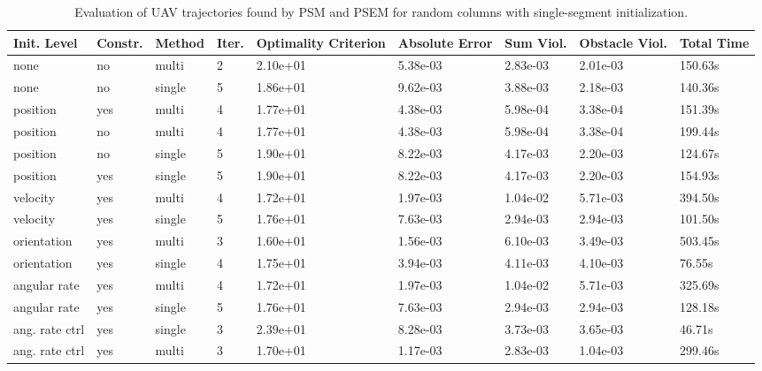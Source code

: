 \begin{table}
\small

\caption{Evaluation of UAV trajectories found by PSM and PSEM for random columns with single-segment initialization.}
\label{tab:traj-plan-eval-random_columns-single}
\begin{tabular}{p{21mm}p{9mm}p{12mm}p{6mm}p{14mm}p{14mm}p{14mm}p{14mm}p{14mm}}
\toprule
Init. Level & Constr. & Method & Iter. & Optimality Criterion & Absolute Error & Sum Viol. & Obstacle Viol. & Total Time \\
\midrule
none & no & multi & \cellcolor{color3} 2 & \cellcolor{color9} 2.10e+01 & 5.38e-03 & 2.83e-03 & 2.01e-03 & 150.63s \\
none & no & single & \cellcolor{color8} 5 & 1.86e+01 & \cellcolor{color8} 9.62e-03 & 3.88e-03 & 2.18e-03 & 140.36s \\
position & yes & multi & 4 & 1.77e+01 & 4.38e-03 & \cellcolor{color3} 5.98e-04 & \cellcolor{color3} 3.38e-04 & 151.39s \\
position & no & multi & 4 & 1.77e+01 & 4.38e-03 & \cellcolor{color3} 5.98e-04 & \cellcolor{color3} 3.38e-04 & 199.44s \\
position & no & single & \cellcolor{color8} 5 & 1.90e+01 & 8.22e-03 & 4.17e-03 & 2.20e-03 & 124.67s \\
position & yes & single & \cellcolor{color8} 5 & 1.90e+01 & 8.22e-03 & 4.17e-03 & 2.20e-03 & 154.93s \\
velocity & yes & multi & 4 & 1.72e+01 & 1.97e-03 & \cellcolor{color8} 1.04e-02 & \cellcolor{color8} 5.71e-03 & \cellcolor{color9} 394.50s \\
velocity & yes & single & \cellcolor{color8} 5 & 1.76e+01 & 7.63e-03 & 2.94e-03 & 2.94e-03 & 101.50s \\
orientation & yes & multi & \cellcolor{color10} 3 & \cellcolor{color3} 1.60e+01 & \cellcolor{color10} 1.56e-03 & 6.10e-03 & 3.49e-03 & \cellcolor{color8} 503.45s \\
orientation & yes & single & 4 & 1.75e+01 & 3.94e-03 & 4.11e-03 & 4.10e-03 & \cellcolor{color10} 76.55s \\
angular rate & yes & multi & 4 & 1.72e+01 & 1.97e-03 & \cellcolor{color8} 1.04e-02 & \cellcolor{color8} 5.71e-03 & 325.69s \\
angular rate & yes & single & \cellcolor{color8} 5 & 1.76e+01 & 7.63e-03 & 2.94e-03 & 2.94e-03 & 128.18s \\
ang. rate ctrl & yes & single & \cellcolor{color10} 3 & \cellcolor{color8} 2.39e+01 & \cellcolor{color9} 8.28e-03 & 3.73e-03 & 3.65e-03 & \cellcolor{color3} 46.71s \\
ang. rate ctrl & yes & multi & \cellcolor{color10} 3 & \cellcolor{color10} 1.70e+01 & \cellcolor{color3} 1.17e-03 & 2.83e-03 & 1.04e-03 & 299.46s \\
\bottomrule
\end{tabular}
\end{table}
